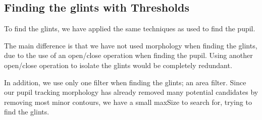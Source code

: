 \subsection{Finding the glints with Thresholds}
To find the glints, we have applied the same techniques as used to find the pupil.\newline

The main difference is that we have not used morphology when finding the glints, due to the use of an open/close operation when finding the pupil. Using another open/close operation to isolate the glints would be completely redundant.\newline

In addition, we use only one filter when finding the glints; an area filter. Since our pupil tracking morphology has already removed many potential candidates by removing most minor contours, we have a small maxSize to search for, trying to find the glints.